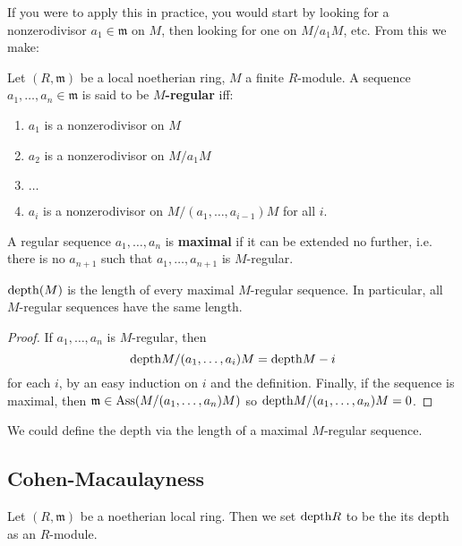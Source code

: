 If you were to apply this in practice, you would start by
looking for a
nonzerodivisor $a_1 \in \mathfrak{m}$ on $M$, then looking for
one on $M/a_1
M$, etc.
From this we make:

\begin{definition} 
Let $(R, \mathfrak{m})$ be a local noetherian ring, $M$ a finite
$R$-module. A
sequence $a_1, \dots, a_n \in \mathfrak{m}$ is said to be
\textbf{$M$-regular} iff:
\begin{enumerate}
\item $a_1$ is a nonzerodivisor on $M$ 
\item $a_2$ is a nonzerodivisor on $M/a_1 M$
\item  $\dots$
\item $a_i$ is a nonzerodivisor on $M/(a_1, \dots, a_{i-1})M$
for all $i$.
\end{enumerate}
A regular sequence $a_1, \dots, a_n$ is \textbf{maximal } if it
can be extended
no further, i.e. there is no $a_{n+1}$ such that $a_1, \dots,
a_{n+1}$ is
$M$-regular.
\end{definition} 

\begin{corollary} 
$\mathrm{depth}(M)$ is the length of every maximal $M$-regular sequence.
In particular,
all $M$-regular sequences have the same length. 
\end{corollary} 

\begin{proof} 
If $a_1, \dots, a_n$ is $M$-regular, then
\[ \mathrm{depth} M/(a_1, \dots, a_i)M = \mathrm{depth} M -i  \]
for each $i$, by an easy induction on $i$ and the definition.
Finally, if the sequence is maximal,
then $\mathfrak{m} \in \operatorname{Ass}(M/(a_1, \dots, a_n)M)$ so $\mathrm{depth}
M/(a_1, \dots,
a_n) M = 0$.
\end{proof} 

\begin{remark} 
We could define the depth via the length of a maximal
$M$-regular sequence.
\end{remark} 


\subsection{Cohen-Macaulayness}

\begin{definition} 
Let $(R, \mathfrak{m})$ be a noetherian local ring. Then 
we set $\mathrm{depth} R$ to be the its depth as an $R$-module.
\end{definition} 




